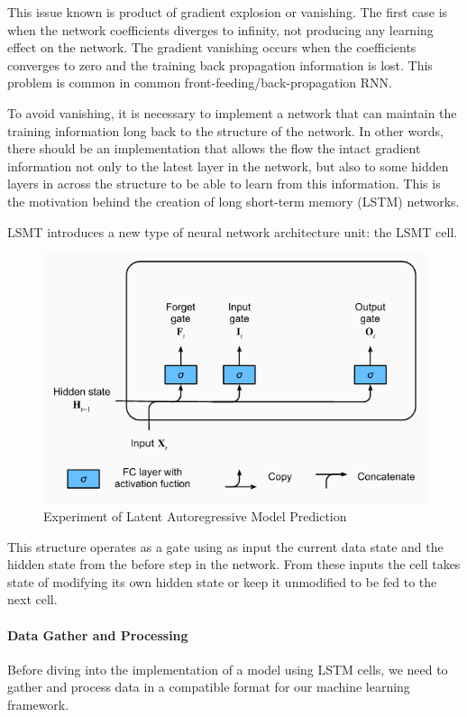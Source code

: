 This issue known is product of gradient explosion or vanishing. The first case is when
the network coefficients diverges to infinity, not producing any learning effect on the
network. The gradient vanishing occurs when the coefficients converges to zero and
the training back propagation information is lost. This problem is common in common
front-feeding/back-propagation RNN.

To avoid vanishing, it is necessary to implement a network that can maintain the
training information long back to the structure of the network. In other words, there
should be an implementation that allows the flow the intact gradient information not
only to the latest layer in the network, but also to some hidden layers in across the
structure to be able to learn from this information. This is the motivation behind the
creation of long short-term memory (LSTM) networks.

LSMT introduces a new type of neural network architecture unit: the LSMT cell.

\begin{figure}[h!]
  \caption{Experiment of Latent Autoregressive Model Prediction}
  \includegraphics[width=\linewidth]{image/fig_JDF14.png}
\end{figure}


This structure operates as a gate using as input the current data state and the hidden
state from the before step in the network. From these inputs the cell takes state of
modifying its own hidden state or keep it unmodified to be fed to the next cell.

\paragraph{Data Gather and Processing} Before diving into the implementation of a model
using LSTM cells, we need to gather and process data in a compatible format for our
machine learning framework.

